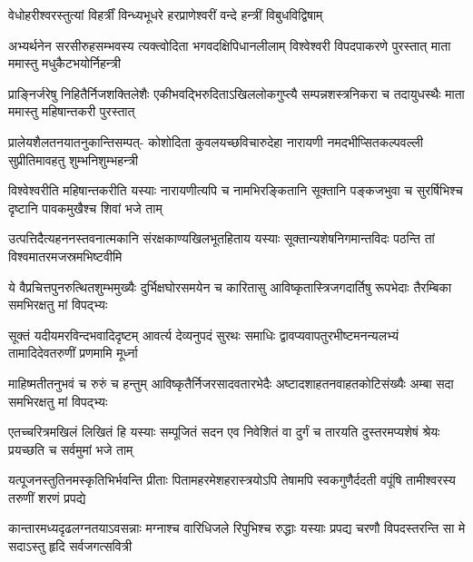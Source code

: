

\twolineshloka
{वेधोहरीश्वरस्तुत्यां विहर्त्रीं विन्ध्यभूधरे}
{हरप्राणेश्वरीं वन्दे हन्त्रीं विबुधविद्विषाम्}%

\fourlineindentedshloka
{अभ्यर्थनेन सरसीरुहसम्भवस्य}
{त्यक्त्वोदिता भगवदक्षिपिधानलीलाम्}
{विश्वेश्वरी विपदपाकरणे पुरस्तात्}
{माता ममास्तु मधुकैटभयोर्निहन्त्री} %

\fourlineindentedshloka
{प्राङ्निर्जरेषु निहितैर्निजशक्तिलेशैः}
{एकीभवद्भिरुदिताऽखिललोकगुप्त्यै}
{सम्पन्नशस्त्रनिकरा च तदायुधस्थैः}
{माता ममास्तु महिषान्तकरी पुरस्तात्} %

\fourlineindentedshloka
{प्रालेयशैलतनयातनुकान्तिसम्पत्-}
{कोशोदिता कुवलयच्छविचारुदेहा}
{नारायणी नमदभीप्सितकल्पवल्ली}
{सुप्रीतिमावहतु शुम्भनिशुम्भहन्त्री} %


\fourlineindentedshloka
{विश्वेश्वरीति महिषान्तकरीति यस्याः}
{नारायणीत्यपि च नामभिरङ्कितानि}
{सूक्तानि पङ्कजभुवा च सुरर्षिभिश्च}
{दृष्टानि पावकमुखैश्च शिवां भजे ताम्} %


\fourlineindentedshloka
{उत्पत्तिदैत्यहननस्तवनात्मकानि}
{संरक्षकाण्यखिलभूतहिताय यस्याः}
{सूक्तान्यशेषनिगमान्तविदः पठन्ति}
{तां विश्वमातरमजस्रमभिष्टवीमि} %

\fourlineindentedshloka
{ये वैप्रचित्तपुनरुत्थितशुम्भमुख्यैः}
{दुर्भिक्षघोरसमयेन च कारितासु}
{आविष्कृतास्त्रिजगदार्तिषु रूपभेदाः}
{तैरम्बिका समभिरक्षतु मां विपद्भ्यः} %


\fourlineindentedshloka
{सूक्तं यदीयमरविन्दभवादिदृष्टम्}
{आवर्त्य देव्यनुपदं सुरथः समाधिः}
{द्वावप्यवापतुरभीष्टमनन्यलभ्यं}
{तामादिदेवतरुणीं प्रणमामि मूर्ध्ना} %

\fourlineindentedshloka
{माहिष्मतीतनुभवं च रुरुं च हन्तुम्}
{आविष्कृतैर्निजरसादवतारभेदैः}
{अष्टादशाहतनवाहतकोटिसंख्यैः}
{अम्बा सदा समभिरक्षतु मां विपद्भ्यः} %

\fourlineindentedshloka
{एतच्चरित्रमखिलं लिखितं हि यस्याः}
{सम्पूजितं सदन एव निवेशितं वा}
{दुर्गं च तारयति दुस्तरमप्यशेषं}
{श्रेयः प्रयच्छति च सर्वमुमां भजे ताम्} %


\fourlineindentedshloka
{यत्पूजनस्तुतिनमस्कृतिभिर्भवन्ति}
{प्रीताः पितामहरमेशहरास्त्रयोऽपि}
{तेषामपि स्वकगुणैर्ददती वपूंषि}
{तामीश्वरस्य तरुणीं शरणं प्रपद्ये} %


\fourlineindentedshloka
{कान्तारमध्यदृढलग्नतयाऽवसन्नाः}
{मग्नाश्च वारिधिजले रिपुभिश्च रुद्धाः}
{यस्याः प्रपद्य चरणौ विपदस्तरन्ति}
{सा मे सदाऽस्तु हृदि सर्वजगत्सवित्री} %


